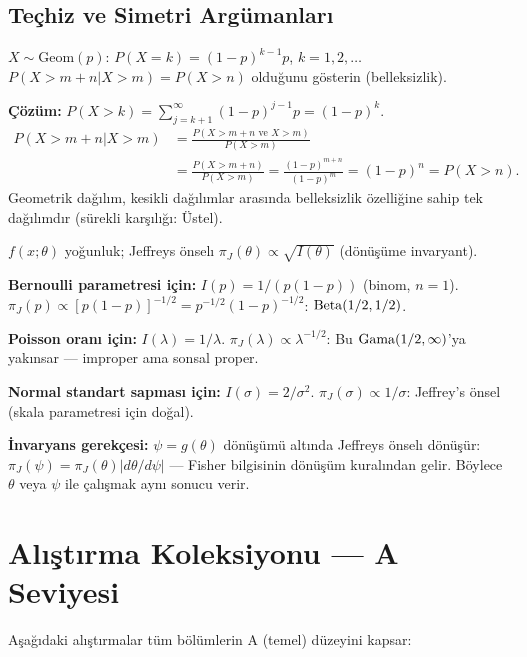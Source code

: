 \subsection{Teçhiz ve Simetri Argümanları}

\begin{ornek}
$X\sim\mathrm{Geom}(p)$: $P(X=k)=(1-p)^{k-1}p$, $k=1,2,\ldots$
$P(X>m+n|X>m)=P(X>n)$ olduğunu gösterin (belleksizlik).

\textbf{Çözüm:}
$P(X>k)=\sum_{j=k+1}^\infty(1-p)^{j-1}p=(1-p)^k$.
\begin{align*}
P(X>m+n|X>m) &= \frac{P(X>m+n\text{ ve }X>m)}{P(X>m)}\\
&= \frac{P(X>m+n)}{P(X>m)} = \frac{(1-p)^{m+n}}{(1-p)^m} = (1-p)^n = P(X>n).
\end{align*}
Geometrik dağılım, kesikli dağılımlar arasında belleksizlik özelliğine sahip tek dağılımdır (sürekli karşılığı: Üstel).
\end{ornek}

\begin{ornek}
$f(x;\theta)$ yoğunluk; Jeffreys önselı $\pi_J(\theta)\propto\sqrt{I(\theta)}$ (dönüşüme invaryant).

\textbf{Bernoulli parametresi için:} $I(p)=1/(p(1-p))$ (binom, $n=1$).
$\pi_J(p)\propto [p(1-p)]^{-1/2}=p^{-1/2}(1-p)^{-1/2}$: $\operatorname{Beta}(1/2,1/2)$.

\textbf{Poisson oranı için:} $I(\lambda)=1/\lambda$.
$\pi_J(\lambda)\propto\lambda^{-1/2}$: Bu $\operatorname{Gama}(1/2,\infty)$'ya yakınsar --- improper ama sonsal proper.

\textbf{Normal standart sapması için:} $I(\sigma)=2/\sigma^2$.
$\pi_J(\sigma)\propto 1/\sigma$: Jeffrey's önsel (skala parametresi için doğal).

\textbf{İnvaryans gerekçesi:} $\psi=g(\theta)$ dönüşümü altında Jeffreys önselı dönüşür: $\pi_J(\psi)=\pi_J(\theta)|d\theta/d\psi|$ --- Fisher bilgisinin dönüşüm kuralından gelir. Böylece $\theta$ veya $\psi$ ile çalışmak aynı sonucu verir.
\end{ornek}

\section{Alıştırma Koleksiyonu --- A Seviyesi}
\label{app:A_seviye}

Aşağıdaki alıştırmalar tüm bölümlerin A (temel) düzeyini kapsar:

